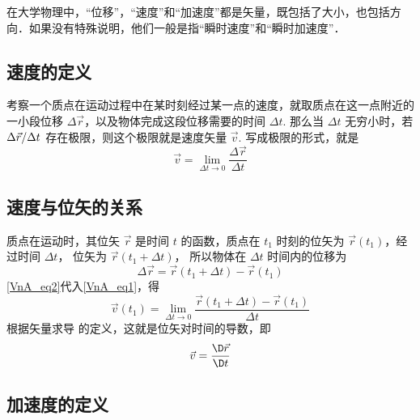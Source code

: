
在大学物理中，“位移”，“速度”和“加速度”都是矢量，既包括了大小，也包括方向．如果没有特殊说明，他们一般是指“瞬时速度”和“瞬时加速度”．

\subsection{速度的定义}
考察一个质点在运动过程中在某时刻经过某一点的速度，就取质点在这一点附近的一小段位移 $\Delta\vec r$，以及物体完成这段位移需要的时间 $\Delta t$. 那么当 $\Delta t$ 无穷小时，若 ${{\Delta \vec r} \mathord{\left/
 {\vphantom {{\Delta \vec s} {\Delta t}}} \right.
 \kern-\nulldelimiterspace} {\Delta t}}$ 存在极限，则这个极限就是速度矢量 $\vec v$. 写成极限的形式，就是
\begin{equation}\label{VnA_eq1}
\vec v = \mathop {\lim }\limits_{\Delta t \to 0} \frac{{\Delta \vec r}}{{\Delta t}}
\end{equation}

\subsection{速度与位矢的关系}

质点在运动时，其位矢 $\vec r$ 是时间 $t$ 的函数，质点在 ${t_1}$ 时刻的位矢为 $\vec r\left( {{t_1}} \right)$，经过时间 $\Delta t$， 位矢为 $\vec r\left( {{t_1} + \Delta t} \right)$， 所以物体在 $\Delta t$ 时间内的位移为
\begin{equation}\label{VnA_eq2}
\Delta \vec r = \vec r\left( {{t_1} + \Delta t} \right) - \vec r\left( {{t_1}} \right)
\end{equation}
\autoref{VnA_eq2}代入\autoref{VnA_eq1}，得
\begin{equation}\label{VnA_eq3}
\vec v(t_1) = \mathop {\lim }\limits_{\Delta t \to 0} \frac{{\vec r\left( {{t_1} + \Delta t} \right) - \vec r\left( {{t_1}} \right)}}{{\Delta t}}
\end{equation}
根据矢量求导 的定义，这就是位矢对时间的导数，即
\begin{equation}
\vec v = \frac{\D \vec r}{\D t}
\end{equation}


\subsection{加速度的定义}

